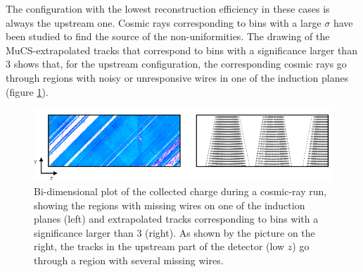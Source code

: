 \documentclass[a4paper,11pt]{article}
\begin{document}
%

The configuration with the lowest reconstruction efficiency in these cases is always the upstream one. Cosmic rays corresponding to bins with a large $\sigma$ have been studied to find the source of the non-uniformities. The drawing of the MuCS-extrapolated tracks that correspond to bins with a significance larger than 3 shows that, for the upstream configuration, the corresponding cosmic rays go through regions with noisy or unresponsive wires in one of the induction planes (figure \ref{fig:wires}).

\begin{figure}[htbp]
  \begin{center}
    \includegraphics[width=1\linewidth]{figures/wire_tracks.png}
    \caption{Bi-dimensional plot of the collected charge during a cosmic-ray run, showing the regions with missing wires on one of the induction planes (left) and extrapolated tracks corresponding to bins with a significance larger than 3 (right). As shown by the picture on the right, the tracks in the upstream part of the detector (low $z$) go through a region with several missing wires.} \label{fig:wires}
  \end{center}
\end{figure}
\end{document}
